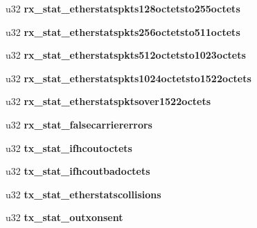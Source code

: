 \begin{DoxyCompactItemize}
\item 
\hypertarget{structemac__stats_ac8a62861d0f35d2532c9a026494e4e48}{
u32 {\bfseries rx\_\-stat\_\-etherstatspkts128octetsto255octets}}
\label{structemac__stats_ac8a62861d0f35d2532c9a026494e4e48}

\item 
\hypertarget{structemac__stats_ae80e2a23a59d53e919fac827b50208e1}{
u32 {\bfseries rx\_\-stat\_\-etherstatspkts256octetsto511octets}}
\label{structemac__stats_ae80e2a23a59d53e919fac827b50208e1}

\item 
\hypertarget{structemac__stats_a9d17ddebfc0e655f0609eaa65f237781}{
u32 {\bfseries rx\_\-stat\_\-etherstatspkts512octetsto1023octets}}
\label{structemac__stats_a9d17ddebfc0e655f0609eaa65f237781}

\item 
\hypertarget{structemac__stats_a1b502507ef4e599e7227c2c89468c19b}{
u32 {\bfseries rx\_\-stat\_\-etherstatspkts1024octetsto1522octets}}
\label{structemac__stats_a1b502507ef4e599e7227c2c89468c19b}

\item 
\hypertarget{structemac__stats_af0f43aaa39e6e104a4a2d7b161071940}{
u32 {\bfseries rx\_\-stat\_\-etherstatspktsover1522octets}}
\label{structemac__stats_af0f43aaa39e6e104a4a2d7b161071940}

\item 
\hypertarget{structemac__stats_a25aecf41d798897e56392950d6afe473}{
u32 {\bfseries rx\_\-stat\_\-falsecarriererrors}}
\label{structemac__stats_a25aecf41d798897e56392950d6afe473}

\item 
\hypertarget{structemac__stats_a2dc33ae959fa74d87643a6e9d338c970}{
u32 {\bfseries tx\_\-stat\_\-ifhcoutoctets}}
\label{structemac__stats_a2dc33ae959fa74d87643a6e9d338c970}

\item 
\hypertarget{structemac__stats_a7d3ce125a260f3f3a21381f4fe367938}{
u32 {\bfseries tx\_\-stat\_\-ifhcoutbadoctets}}
\label{structemac__stats_a7d3ce125a260f3f3a21381f4fe367938}

\item 
\hypertarget{structemac__stats_a1d9bead7cb26c23658b779c852131c55}{
u32 {\bfseries tx\_\-stat\_\-etherstatscollisions}}
\label{structemac__stats_a1d9bead7cb26c23658b779c852131c55}

\item 
\hypertarget{structemac__stats_a182464c90234a27d1b754b1ac7efda5c}{
u32 {\bfseries tx\_\-stat\_\-outxonsent}}
\label{structemac__stats_a182464c90234a27d1b754b1ac7efda5c}


\end{DoxyCompactItemize}
